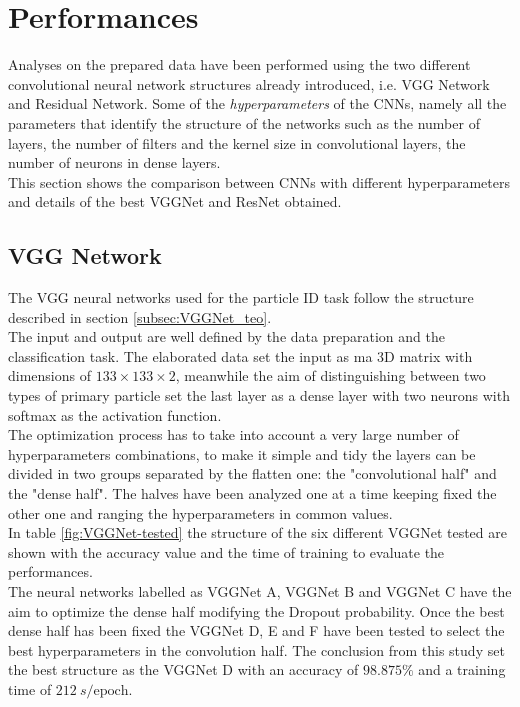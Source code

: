 \section{Performances}\label{sec:NN_perf}
Analyses on the prepared data have been performed using the two different convolutional neural network structures already introduced, i.e. VGG Network and Residual Network. Some of the \textit{hyperparameters} of the CNNs, namely all the parameters that identify the structure of the networks such as the number of layers, the number of filters and the kernel size in convolutional layers, the number of neurons in dense layers.\\
This section shows the comparison between CNNs with different hyperparameters and details of the best VGGNet and ResNet obtained.

\subsection{VGG Network}
The VGG neural networks used for the particle ID task follow the structure described in section \ref{subsec:VGGNet_teo}.\\
The input and output are well defined by the data preparation and the classification task. The elaborated data set the input as ma 3D matrix with dimensions of $133\times 133\times 2$, meanwhile the aim of distinguishing between two types of primary particle set the last layer as a dense layer with two neurons with softmax as the activation function.\\
The optimization process has to take into account a very large number of hyperparameters combinations, to make it simple and tidy the layers can be divided in two groups separated by the flatten one: the "convolutional half" and the "dense half". The halves have been analyzed one at a time keeping fixed the other one and ranging the hyperparameters in common values.\\
In table \ref{fig:VGGNet-tested} the structure of the six different VGGNet tested are shown with the accuracy value and the time of training to evaluate the performances.\\
The neural networks labelled as VGGNet A, VGGNet B and VGGNet C have the aim to optimize the dense half modifying the Dropout probability. Once the best dense half has been fixed the VGGNet D, E and F have been tested to select the best hyperparameters in the convolution half. The conclusion from this study set the best structure as the VGGNet D with an accuracy of $98.875\%$ and a training time of $212\ s/\text{epoch}$.\\

